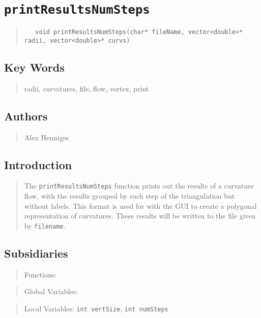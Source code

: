 \documentclass[10pt]{article}%
\begin{document}

\section*{\texttt{printResultsNumSteps}}

\label{f0}\begin{quotation} {\small{\begin{verbatim} 
   void printResultsNumSteps(char* fileName, vector<double>* radii, vector<double>* curvs)
   \end{verbatim}
}}
\end{quotation}
\subsection*{Key Words}

\begin{quotation} radii, curvatures, file, flow, vertex, print\end{quotation}

\subsection*{Authors}

\begin{quotation} Alex Henniges\end{quotation}

\subsection*{Introduction}

\begin{quotation} The \texttt{printResultsNumSteps} function prints out the results of a curvature flow, with the results grouped by each step of the triangulation but without labels. This format is used for with the GUI to create a polygonal representation of curvatures. These results will be written to the file given by \texttt{filename}.\end{quotation}

\subsection*{Subsidiaries}

\begin{quotation} Functions:\end{quotation}
\begin{quotation} Global Variables:\end{quotation}
\begin{quotation} Local Variables: \texttt{int vertSize}, \texttt{int numSteps}\end{quotation}
\end{document}
